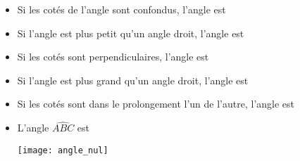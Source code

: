 \begin{mydefs}
	\begin{itemize}
		\item Si les cotés de l'angle sont confondus, l'angle est 
		
		
		\item Si l'angle est plus petit qu'un angle droit, l'angle est
		
		\item Si les cotés sont perpendiculaires, l'angle est 
		
		\item Si l'angle est plus grand qu'un angle droit, l'angle est
		
		\item Si les cotés sont dans le prolongement l'un de l'autre, l'angle est
	\end{itemize}
\end{mydefs}

\begin{myexs}
	\begin{itemize}
		
			

	
		\item L'angle $\widehat{ABC}$ est 
			\begin{center}
				\texttt{[image: angle\_nul]}
			\end{center}
		
	\end{itemize}
\end{myexs}